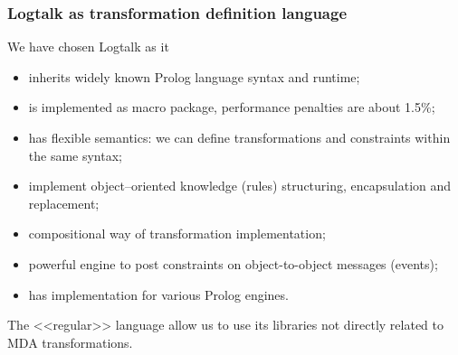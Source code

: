 \documentclass[10pt]{beamer}
\begin{document}
\begin{frame}
  \frametitle{Logtalk as transformation definition language}
  We have chosen Logtalk as it
  \begin{itemize}
  \item inherits widely known Prolog language syntax and runtime;
  \item is implemented as macro package, performance penalties are about 1.5\%;
  \item has flexible semantics: we can define transformations and constraints within the same syntax;
  \item implement object--oriented knowledge (rules) structuring, encapsulation and replacement;
  \item compositional way of transformation implementation;
  \item powerful engine to post constraints on object-to-object messages (events);
  \item has implementation for various Prolog engines.
  \end{itemize}
  The <<regular>> language allow us to use its libraries not directly related to MDA transformations.
\end{frame}
\end{document}
